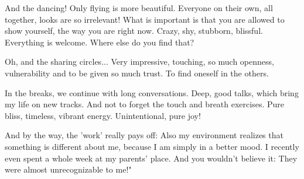 And the dancing! Only flying is more beautiful. Everyone on their own, all together, looks are so irrelevant! What is important is that you are allowed to show yourself, the way you are right now. Crazy, shy, stubborn, blissful. Everything is welcome. Where else do you find that?

Oh, and the sharing circles... Very impressive, touching, so much openness, vulnerability and to be given so much trust. To find oneself in the others.

In the breaks, we continue with long conversations. Deep, good talks, which bring my life on new tracks. And not to forget the touch and breath exercises. Pure bliss, timeless, vibrant energy. Unintentional, pure joy!

And by the way, the 'work' really pays off: Also my environment realizes that something is different about me, because I am simply in a better mood. I recently even spent a whole week at my parents' place. And you wouldn't believe it: They were almost unrecognizable to me!"
